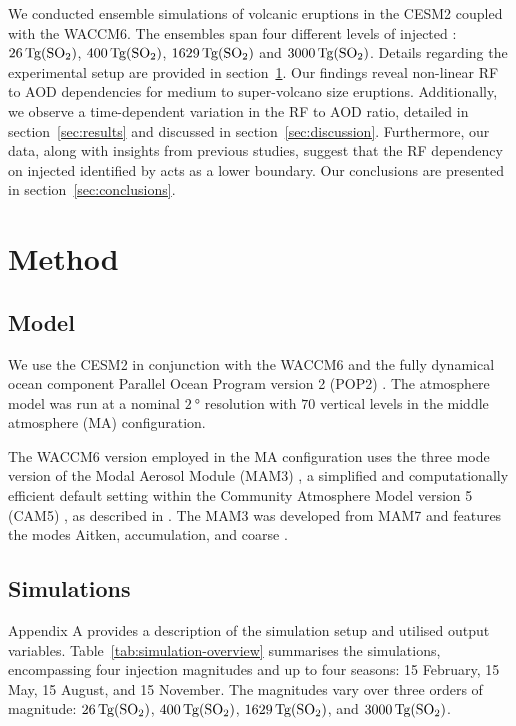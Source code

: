 \documentclass[draft]{agujournal2019}
\newcommand{\iso}[1][i]{{#1}njected \ce{SO2}}
\begin{document}
We conducted ensemble simulations of volcanic eruptions in the CESM2 coupled with the
WACCM6. The ensembles span four different levels of \iso{}:
\(\SI{26}{\tera\gram(\ce{SO2})}\), \(\SI{400}{\tera\gram(\ce{SO2})}\),
\(\SI{1629}{\tera\gram(\ce{SO2})}\) and \(\SI{3000}{\tera\gram(\ce{SO2})}\). Details
regarding the experimental setup are provided in section~\ref{sec:method}. Our findings
reveal non-linear RF to AOD dependencies for medium to super-volcano size eruptions.
Additionally, we observe a time-dependent variation in the RF to AOD ratio, detailed in
section~\ref{sec:results} and discussed in section~\ref{sec:discussion}. Furthermore,
our data, along with insights from previous studies, suggest that the RF dependency on
\iso{} identified by  acts as a lower boundary. Our conclusions are
presented in section~\ref{sec:conclusions}.

\section{Method}\label{sec:method}

\subsection{Model}

We use the CESM2 \cite{danabasoglu2020} in conjunction with the WACCM6
\cite{gettleman2019} and the fully dynamical ocean component Parallel Ocean Program
version 2 (POP2) \cite{smith2010, danabasoglu2020}. The atmosphere model was run at a
nominal \(\SI{2}{\degree}\) resolution with \(70\) vertical levels in the middle
atmosphere (MA) configuration.

The WACCM6 version employed in the MA configuration uses the three mode version of the
Modal Aerosol Module (MAM3) \cite{gettleman2019}, a simplified and computationally
efficient default setting within the Community Atmosphere Model version 5 (CAM5)
\cite{liu2016}, as described in . The MAM3 was developed from MAM7 and
features the modes Aitken, accumulation, and coarse \cite{liu2016}.

\subsection{Simulations}

Appendix A provides a description of the simulation setup and utilised output variables.
Table~\ref{tab:simulation-overview} summarises the simulations, encompassing four
 injection magnitudes and up to four seasons: 15 February, 15 May, 15 August,
and 15 November. The magnitudes vary over three orders of magnitude:
\(\SI{26}{\tera\gram(\ce{SO2})}\), \(\SI{400}{\tera\gram(\ce{SO2})}\),
\(\SI{1629}{\tera\gram(\ce{SO2})}\), and \(\SI{3000}{\tera\gram(\ce{SO2})}\).
\end{document}
